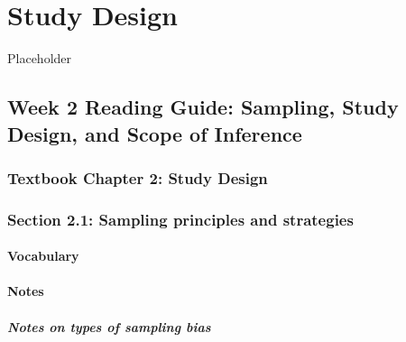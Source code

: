 \documentclass[
]{report}
\begin{document}
\newpage

\hypertarget{study-design}{%
\chapter{Study Design}\label{study-design}}

Placeholder

\hypertarget{week-2-reading-guide-sampling-study-design-and-scope-of-inference}{%
\section{Week 2 Reading Guide: Sampling, Study Design, and Scope of Inference}\label{week-2-reading-guide-sampling-study-design-and-scope-of-inference}}

\hypertarget{textbook-chapter-2-study-design}{%
\subsection*{Textbook Chapter 2: Study Design}\label{textbook-chapter-2-study-design}}

\hypertarget{section-2.1-sampling-principles-and-strategies}{%
\subsection*{Section 2.1: Sampling principles and strategies}\label{section-2.1-sampling-principles-and-strategies}}

\hypertarget{vocabulary-1}{%
\subsubsection*{Vocabulary}\label{vocabulary-1}}

\hypertarget{notes-1}{%
\subsubsection*{Notes}\label{notes-1}}

\hypertarget{notes-on-types-of-sampling-bias}{%
\paragraph*{Notes on types of sampling bias}\label{notes-on-types-of-sampling-bias}}
\end{document}
